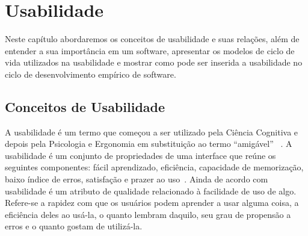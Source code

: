 \chapter{Usabilidade}

Neste capítulo abordaremos os conceitos de usabilidade e suas relações, além de entender a sua importância em um software, apresentar os modelos de ciclo de vida utilizados na usabilidade e mostrar como pode ser inserida a usabilidade no ciclo de desenvolvimento empírico de software.

\section{Conceitos de Usabilidade}

A usabilidade é um termo que começou a ser utilizado pela Ciência Cognitiva e depois pela Psicologia e Ergonomia em substituição ao termo ``amigável'' ~\cite{dias2006}.
% 
A usabilidade é um conjunto de propriedades de uma interface que reúne os seguintes componentes: fácil aprendizado, eficiência, capacidade de memorização, baixo índice de erros, satisfação e prazer ao uso~\cite{nielsen1994}.
%
Ainda de acordo com  usabilidade é um atributo de qualidade relacionado à facilidade de uso de algo. Refere-se a rapidez com que os usuários podem aprender a usar alguma coisa, a eficiência deles ao usá-la, o quanto lembram daquilo, seu grau de propensão a erros e o quanto gostam de utilizá-la. 
%


